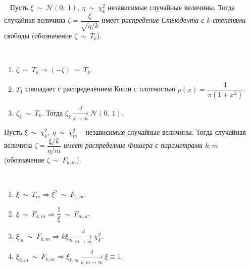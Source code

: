 \begin{definition} ~
    Пусть $\displaystyle \xi \ \sim \ \mathcal{N}( 0,\ 1) ,\ \eta \ \sim \ \chi _{k}^{2}$ независимые случайные величины. Тогда случайная величина $\displaystyle \zeta =\dfrac{\xi }{\sqrt{\eta /k}}$ имеет \textit{распредение Стьюдента с}\textit{ }$\displaystyle k$\textit{ степенями} свободы (обозначение $\displaystyle \zeta \ \sim \ T_{k}$).
\end{definition}
\begin{proposition} ~
    \begin{enumerate}
        \item $\displaystyle \zeta \ \sim \ T_{k} \Rightarrow ( -\zeta ) \ \sim \ T_{k}$.
        
        \item $\displaystyle T_{1}$ совпадает с распределением Коши с плотностью $\displaystyle p( x) =\dfrac{1}{\pi \left( 1+x^{2}\right)}$.
        
        \item $\displaystyle \zeta _{k} \ \sim \ T_{k}$. Тогда $\displaystyle \zeta _{k}\xrightarrow[k\rightarrow \infty ]{d}\mathcal{N}( 0,\ 1)$.
    \end{enumerate}
\end{proposition}
\begin{definition}
    Пусть $\displaystyle \xi \ \sim \ \chi _{k}^{2} ,\ \eta \ \sim \ \chi _{m}^{2}$ -- независимые случайные величины. Тогда случайная величина $\displaystyle \zeta =\dfrac{\xi /k}{\eta /m}$ \textit{имеет}\textit{ распределние Фишера }\textit{с параметрами}\textit{ }$\displaystyle k,m$ (обозначение $\displaystyle \zeta \ \sim \ F_{k,m}$).
\end{definition}
\begin{proposition} ~
    \begin{enumerate}
        \item $\displaystyle \xi \ \sim \ T_{m} \Rightarrow \xi ^{2} \ \sim \ F_{1,m}$.
        
        \item $\displaystyle \xi \ \sim \ F_{k,m} \Rightarrow \dfrac{1}{\xi } \ \sim \ F_{m,k}$.
        
        \item $\displaystyle \xi _{m} \ \sim \ F_{k,m} \Rightarrow k\xi _{m}\xrightarrow[m\rightarrow \infty ]{d} \chi _{k}^{2}$.
        
        \item $\displaystyle \xi _{k,m} \ \sim \ F_{k,m} \Rightarrow \xi _{k,m}\xrightarrow[k,m\rightarrow \infty ]{d} \xi \equiv 1$.
    \end{enumerate}
\end{proposition}
